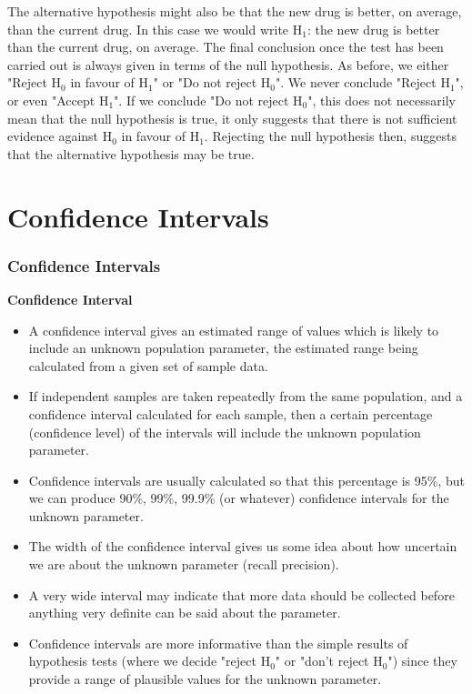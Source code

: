 \documentclass{beamer}
\begin{document}
\begin{frame}
	The alternative hypothesis might also be that the new drug is
	better, on average, than the current drug. In this case we would
	write
	H$_1$: the new drug is better than the current drug, on average.
	The final conclusion once the test has been carried out is always
	given in terms of the null hypothesis. As before, we either "Reject
	H$_0$ in favour of H$_1$" or "Do not reject H$_0$".
	We never conclude "Reject H$_1$", or even "Accept H$_1$".
	If we conclude "Do not reject H$_0$", this does not necessarily mean
	that the null hypothesis is true, it only suggests that there is not
	sufficient evidence against H$_0$ in favour of H$_1$.
	Rejecting the null hypothesis then, suggests that the alternative
	hypothesis may be true.
\end{frame}
\section{Confidence Intervals}
\begin{frame}
	\frametitle{Confidence Intervals}
\textbf{Confidence Interval}
\begin{itemize}
\item 	A confidence interval gives an estimated range of values which is
		likely to include an unknown population parameter, the estimated
		range being calculated from a given set of sample data.
\item If independent samples are taken repeatedly from the same
		population, and a confidence interval calculated for each sample,
		then a certain percentage (confidence level) of the intervals will
		include the unknown population parameter.
\item Confidence intervals are usually calculated so that this percentage is
		95\%, but we can produce 90\%, 99\%, 99.9\% (or whatever)
		confidence intervals for the unknown parameter.
\end{itemize}

\end{frame}
\begin{frame}
\begin{itemize}
\item 	The width of the confidence interval gives us some idea about how
	uncertain we are about the unknown parameter (recall precision). 
\item A
	very wide interval may indicate that more data should be collected
	before anything very definite can be said about the parameter.
\item Confidence intervals are more informative than the simple results of
	hypothesis tests (where we decide "reject H$_0$" or "don't reject H$_0$")
	since they provide a range of plausible values for the unknown
	parameter.
\end{itemize}

\end{frame}
\end{document}
